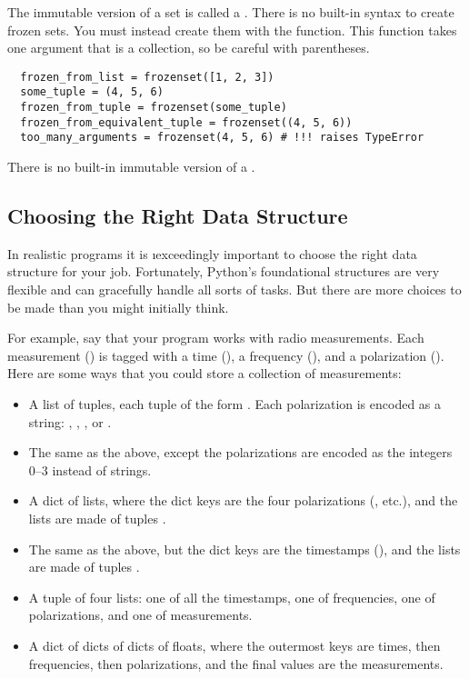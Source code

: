\documentclass[letterpaper, 12pt, titlepage, twoside]{article}
\begin{document}
The immutable version of a set is called a . There is no
built-in syntax to create frozen sets. You must instead create them with the
 function. This function takes one argument that is a
collection, so be careful with parentheses.

\begin{lstlisting}
  frozen_from_list = frozenset([1, 2, 3])
  some_tuple = (4, 5, 6)
  frozen_from_tuple = frozenset(some_tuple)
  frozen_from_equivalent_tuple = frozenset((4, 5, 6))
  too_many_arguments = frozenset(4, 5, 6) # !!! raises TypeError
\end{lstlisting}

There is no built-in immutable version of a .

\subsection*{Choosing the Right Data Structure}

In realistic programs it is \i{exceedingly} important to choose the right data
structure for your job. Fortunately, Python's foundational structures are very
flexible and can gracefully handle all sorts of tasks. But there are more
choices to be made than you might initially think.

For example, say that your program works with radio measurements. Each
measurement () is tagged with a time (), a frequency (), and a
polarization (). Here are some ways that you could store a collection of
measurements:

\begin{itemize}
\item A list of tuples, each tuple of the form . Each
  polarization is encoded as a string: , , , or
  .
\item The same as the above, except the polarizations are encoded as the
  integers 0--3 instead of strings.
\item A dict of lists, where the dict keys are the four polarizations
  (, etc.), and the lists are made of tuples .
\item The same as the above, but the dict keys are the timestamps
  (), and the lists are made of tuples .
\item A tuple of four lists: one of all the timestamps, one of frequencies,
  one of polarizations, and one of measurements.
\item A dict of dicts of dicts of floats, where the outermost keys are times,
  then frequencies, then polarizations, and the final values are the
  measurements.
\end{itemize}
\end{document}
